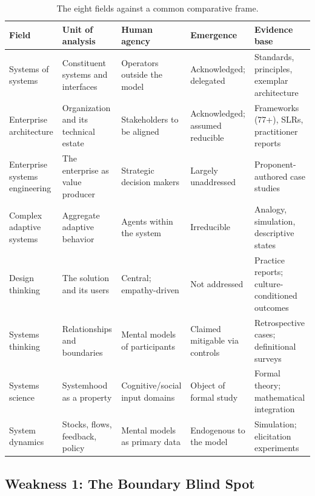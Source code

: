 \documentclass{csimq}
\renewcommand{\arraystretch}{1.4}
\begin{document}
\begin{table}[htbp]
\centering
\footnotesize
\caption{The eight fields against a common comparative frame.}
\label{tab:landscape}
\renewcommand{\arraystretch}{1.25}
\begin{tabular}{@{}p{2.4cm}p{2.9cm}p{2.8cm}p{2.7cm}p{3.6cm}@{}}
\toprule
\textbf{Field} & \textbf{Unit of analysis} & \textbf{Human agency} &
\textbf{Emergence} & \textbf{Evidence base} \\
\midrule
Systems of systems &
Constituent systems and interfaces &
Operators outside the model &
Acknowledged; delegated &
Standards, principles, exemplar architecture \\

Enterprise architecture &
Organization and its technical estate &
Stakeholders to be aligned &
Acknowledged; assumed reducible &
Frameworks (77+), SLRs, practitioner reports \\

Enterprise systems engineering &
The enterprise as value producer &
Strategic decision makers &
Largely unaddressed &
Proponent-authored case studies \\

Complex adaptive systems &
Aggregate adaptive behavior &
Agents within the system &
Irreducible &
Analogy, simulation, descriptive states \\

Design thinking &
The solution and its users &
Central; empathy-driven &
Not addressed &
Practice reports; culture-conditioned outcomes \\

Systems thinking &
Relationships and boundaries &
Mental models of participants &
Claimed mitigable via controls &
Retrospective cases; definitional surveys \\

Systems science &
Systemhood as a property &
Cognitive/social input domains &
Object of formal study &
Formal theory; mathematical integration \\

System dynamics &
Stocks, flows, feedback, policy &
Mental models as primary data &
Endogenous to the model &
Simulation; elicitation experiments \\
\bottomrule
\end{tabular}
\end{table}

\subsection{Weakness 1: The Boundary Blind Spot}
\end{document}
